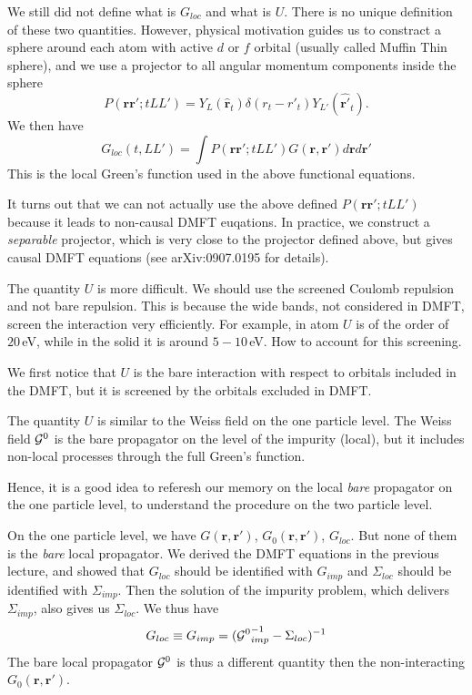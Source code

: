 \documentclass[usenames,letter,landscape,semhelv]{seminar}
\newcommand{\vr}{{\mathbf{r}}}
\begin{document}
\begin{slide}
We still did not define what is $G_{loc}$ and what is $U$. There is no
unique definition of these two quantities. However, physical
motivation guides us to constract a sphere around each atom with
active $d$ or $f$ orbital (usually called Muffin Thin sphere), and we
use a projector to all angular momentum components inside the sphere
\begin{equation}
P(\vr\vr';t L L') = Y_{L}(\hat{\vr}_t)\delta(r_t-{r'}_t)Y_{L'}(\hat{\vr'}_t).
\end{equation}
We then have
\begin{equation}
G_{loc}(t, L L') = \int P(\vr\vr';t L L') G(\vr,\vr')d\vr d\vr'
\end{equation}
This is the local Green's function used in the above functional
equations.

It turns out that we can not actually use the above defined
$P(\vr\vr'; t L L')$ because it leads to non-causal DMFT euqations. In
practice, we construct a \textit{separable} projector, which is very
close to the projector defined above, but gives causal DMFT equations
(see arXiv:0907.0195 for details).



The quantity $U$ is more difficult. We should use the screened Coulomb
repulsion and not bare repulsion. This is because the wide bands, not
considered in DMFT, screen the interaction very efficiently. For
example, in atom $U$ is of the order of $20\,$eV, while in the solid
it is around $5-10\,$eV. How to account for this screening.

We first notice that $U$ is the bare interaction with respect to
orbitals included in the DMFT, but it is screened by the orbitals
excluded in DMFT.

The quantity $U$ is similar to the Weiss field on the one particle
level. The Weiss field ${\cal G}^0$ is the bare propagator on the level of
the impurity (local), but it includes non-local processes
through the full Green's function.


Hence, it is a good idea to referesh our memory on the local
\textit{bare} propagator on the one particle level, to understand the
procedure on the two particle level.


On the one particle level, we have $G(\vr,\vr')$, $G_0(\vr,\vr')$,
$G_{loc}$. But none of them is the \textit{bare} local propagator. We
derived the DMFT equations in the previous lecture, and showed that
$G_{loc}$ should be identified with $G_{imp}$ and $\Sigma_{loc}$
should be identified with $\Sigma_{imp}$. Then the solution of the
impurity problem, which delivers $\Sigma_{imp}$, also gives us
$\Sigma_{loc}$. We thus have
\begin{equation}
G_{loc} \equiv G_{imp} = ({{\cal G}^0}^{-1}_{imp}-\Sigma_{loc})^{-1}
\end{equation}
The bare local propagator ${\cal G}^0$ is thus a different quantity
then the non-interacting $G_0(\vr,\vr')$.


\end{slide}
\end{document}
